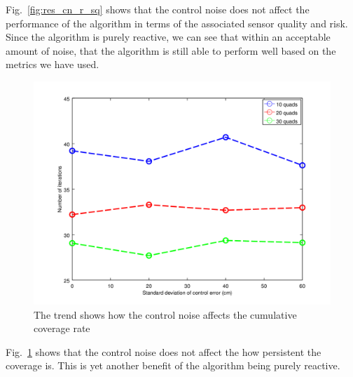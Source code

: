 \documentclass{article}
\begin{document}
Fig.~\ref{fig:res_cn_r_sq} shows that the control noise does not affect the
performance of the algorithm in terms of the associated sensor quality and
risk. Since the algorithm is purely reactive, we can see that within an
acceptable amount of noise, that the algorithm is still able to perform well
based on the metrics we have used.

\begin{figure}

    \includegraphics[width=1\columnwidth]{tasefigs/perf_cn.png}

    \caption{The trend shows how the control noise affects the cumulative
    coverage rate}

    \label{fig:res_perf_cn}

\end{figure}

Fig.~\ref{fig:res_perf_cn} shows that the control noise does not affect the how
persistent the coverage is. This is yet another benefit of the algorithm being
purely reactive.

 
\end{document}
